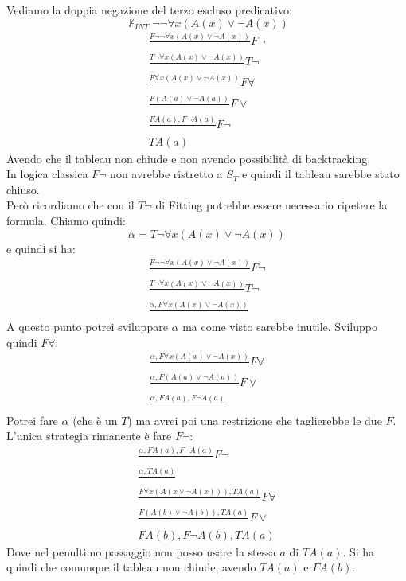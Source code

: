 \documentclass[a4paper,12pt, oneside]{book}
\begin{document}
\begin{esempio}
  Vediamo la doppia negazione del terzo escluso predicativo:
  \[\nvdash_{INT}\neg\neg\forall x(A(x)\lor \neg A(x))\]
  \begin{gather*}
    \frac{F\neg\neg\forall x(A(x)\lor \neg A(x))}{}F\neg\\
    \frac{T\neg\forall x(A(x)\lor\neg A(x))}{}T\neg\\
    \frac{F\forall x(A(x)\lor \neg A(x))}{}F\forall\\
    \frac{F (A(a)\lor \neg A(a))}{}F\lor\\
    \frac{FA(a),F\neg A(a)}{}F\neg\\
    TA(a)  
  \end{gather*}
  Avendo che il tableau non chiude e non avendo possibilità di backtracking.\\
  In logica classica $F\neg$ non avrebbe ristretto a $S_T$ e quindi il tableau
  sarebbe stato chiuso.\\
  Però ricordiamo che con il $T\neg$ di Fitting potrebbe essere necessario
  ripetere la formula.
  Chiamo quindi:
  \[\alpha=T\neg\forall x(A(x)\lor\neg A(x))\]
  e quindi si ha:
  \begin{gather*}
    \frac{F\neg\neg\forall x(A(x)\lor \neg A(x))}{}F\neg\\
    \frac{T\neg\forall x(A(x)\lor\neg A(x))}{}T\neg\\
    \frac{\alpha,F\forall x(A(x)\lor \neg A(x))}{}
  \end{gather*}
  A questo punto potrei sviluppare $\alpha$ ma come visto sarebbe
  inutile. Sviluppo quindi $F\forall$:
  \begin{gather*}
    \frac{\alpha,F\forall x(A(x)\lor \neg A(x))}{}F\forall\\
    \frac{\alpha, F(A(a)\lor \neg A(a))}{}F\lor\\
    \frac{\alpha, FA(a), F\neg A(a)}{}
  \end{gather*}
  Potrei fare $\alpha$ (che è un $T$) ma avrei poi una restrizione che
  taglierebbe le due $F$. L'unica strategia rimanente è fare $F\neg$:
  \begin{gather*}
    \frac{\alpha, FA(a), F\neg A(a)}{}F\neg\\
    \frac{\alpha, TA(a)}{}\\
    \frac{F\forall x(A(x\lor\neg A(x))), TA(a)}{}F\forall\\
    \frac{F(A(b)\lor\neg A(b)), TA(a)}{}F\lor\\
    FA(b), F\neg A(b), TA(a)
  \end{gather*}
  Dove nel penultimo passaggio non posso usare la stessa $a$ di $TA(a)$. Si ha
  quindi che comunque il tableau non chiude, avendo $TA(a)$ e $FA(b)$.
\end{esempio}
\end{document}
